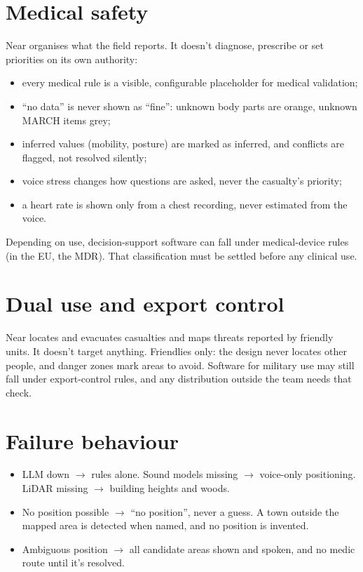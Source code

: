 \section{Medical safety}

Near organises what the field reports. It doesn't diagnose, prescribe or set priorities on its own authority:
\begin{itemize}
  \item every medical rule is a visible, configurable placeholder for medical validation;
  \item ``no data'' is never shown as ``fine'': unknown body parts are orange, unknown MARCH items grey;
  \item inferred values (mobility, posture) are marked as inferred, and conflicts are flagged, not resolved silently;
  \item voice stress changes how questions are asked, never the casualty's priority;
  \item a heart rate is shown only from a chest recording, never estimated from the voice.
\end{itemize}
Depending on use, decision-support software can fall under medical-device rules (in the EU, the MDR). That
classification must be settled before any clinical use.

\section{Dual use and export control}

Near locates and evacuates casualties and maps threats reported by friendly units. It doesn't target anything.
Friendlies only: the design never locates other people, and danger zones mark areas to avoid. Software for military use
may still fall under export-control rules, and any distribution outside the team needs that check.

\section{Failure behaviour}

\begin{itemize}
  \item LLM down $\rightarrow$ rules alone. Sound models missing $\rightarrow$ voice-only positioning. LiDAR missing $\rightarrow$
        building heights and woods.
  \item No position possible $\rightarrow$ ``no position'', never a guess. A town outside the mapped area is detected when named, and
        no position is invented.
  \item Ambiguous position $\rightarrow$ all candidate areas shown and spoken, and no medic route until it's resolved.
\end{itemize}

